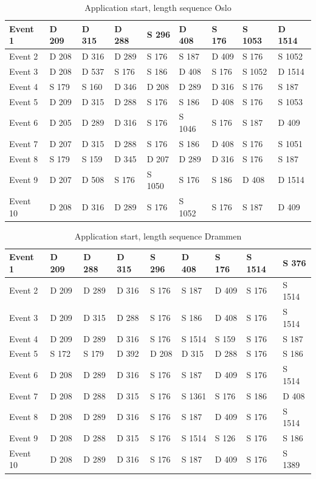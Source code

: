 \begin{table}[H]
\centering
\caption{Application start, length sequence Oslo}
\label{tab:ASSequenceOslo}
\begin{tabular}{|l|l|l|l|l|l|l|l|l|}
\hline
Event 1  & D 209 & D 315 & D 288 & S 296  & D 408  & S 176 & S 1053 & D 1514 \\ \hline
Event 2  & D 208 & D 316 & D 289 & S 176  & S 187  & D 409 & S 176  & S 1052 \\ \hline
Event 3  & D 208 & D 537 & S 176 & S 186  & D 408  & S 176 & S 1052 & D 1514 \\ \hline
Event 4  & S 179 & S 160 & D 346 & D 208  & D 289  & D 316 & S 176  & S 187  \\ \hline
Event 5  & D 209 & D 315 & D 288 & S 176  & S 186  & D 408 & S 176  & S 1053 \\ \hline
Event 6  & D 205 & D 289 & D 316 & S 176  & S 1046 & S 176 & S 187  & D 409  \\ \hline
Event 7  & D 207 & D 315 & D 288 & S 176  & S 186  & D 408 & S 176  & S 1051 \\ \hline
Event 8  & S 179 & S 159 & D 345 & D 207  & D 289  & D 316 & S 176  & S 187  \\ \hline
Event 9  & D 207 & D 508 & S 176 & S 1050 & S 176  & S 186 & D 408  & D 1514 \\ \hline
Event 10 & D 208 & D 316 & D 289 & S 176  & S 1052 & S 176 & S 187  & D 409  \\ \hline
\end{tabular}
\end{table}

\begin{table}[H]
\centering
\caption{Application start, length sequence Drammen}
\label{tab:ASSequenceDrammen}
\begin{tabular}{|l|l|l|l|l|l|l|l|l|}
\hline
Event 1  & D 209 & D 288 & D 315 & S 296 & D 408  & S 176 & S 1514 & S 376  \\ \hline
Event 2  & D 209 & D 289 & D 316 & S 176 & S 187  & D 409 & S 176  & S 1514 \\ \hline
Event 3  & D 209 & D 315 & D 288 & S 176 & S 186  & D 408 & S 176  & S 1514 \\ \hline
Event 4  & D 209 & D 289 & D 316 & S 176 & S 1514 & S 159 & S 176  & S 187  \\ \hline
Event 5  & S 172 & S 179 & D 392 & D 208 & D 315  & D 288 & S 176  & S 186  \\ \hline
Event 6  & D 208 & D 289 & D 316 & S 176 & S 187  & D 409 & S 176  & S 1514 \\ \hline
Event 7  & D 208 & D 288 & D 315 & S 176 & S 1361 & S 176 & S 186  & D 408  \\ \hline
Event 8  & D 208 & D 289 & D 316 & S 176 & S 187  & D 409 & S 176  & S 1514 \\ \hline
Event 9  & D 208 & D 288 & D 315 & S 176 & S 1514 & S 126 & S 176  & S 186  \\ \hline
Event 10 & D 208 & D 289 & D 316 & S 176 & S 187  & D 409 & S 176  & S 1389 \\ \hline
\end{tabular}
\end{table}


